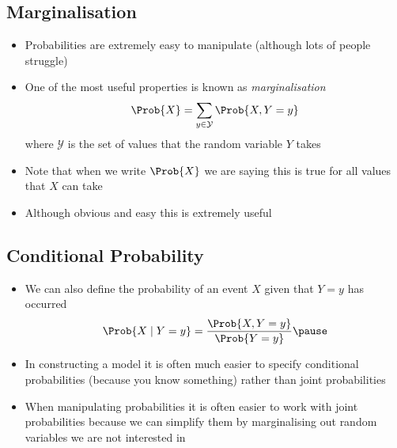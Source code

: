 
\begin{slide}
\section{Marginalisation}

\begin{PauseHighLight}
  \begin{itemize}
  \item Probabilities are extremely easy to manipulate (although lots
    of people struggle)\pause
  \item One of the most useful properties is known as \emph{marginalisation}
    \begin{align*}
      \Prob{X} = \sum_{y\in\mathcal{Y}} \Prob{X, Y=y}
    \end{align*}
    where $\mathcal{Y}$ is the set of values that the random variable
    $Y$ takes\pause
  \item Note that when we write $\Prob{X}$ we are saying this is true
    for all values that $X$ can take\pause
  \item Although obvious and easy this is extremely useful\pause
  \end{itemize}
\end{PauseHighLight}
\end{slide}


\begin{slide}
\section{Conditional Probability}

\begin{PauseHighLight}
  \begin{itemize}
  \item We can also define the probability of an event $X$ given that
    $Y=y$ has occurred
    \begin{align*}
      \Prob{X\mid Y=y} = \frac{\Prob{X,Y=y}}{\Prob{Y=y}}\pause
    \end{align*}
  \item In constructing a model it is often much easier to specify
    conditional probabilities (because you know something) rather than
    joint probabilities\pause
  \item When manipulating probabilities it is often easier to work
    with joint probabilities because we can simplify them by
    marginalising out random variables we are not interested in\pause
  \end{itemize} 
\end{PauseHighLight}

\end{slide}



